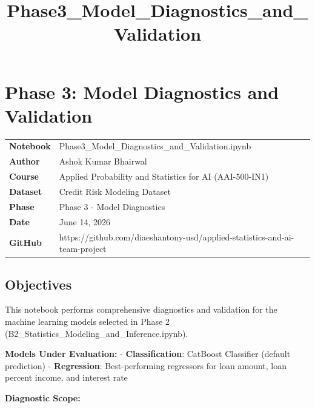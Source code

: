 \documentclass[11pt]{article}
\title{Phase3\_Model\_Diagnostics\_and\_Validation}
\begin{document}
    
    \maketitle
    
    

    
    \section{Phase 3: Model Diagnostics and
Validation}\label{phase-3-model-diagnostics-and-validation}

\begin{longtable}[]{@{}
  >{\raggedright\arraybackslash}p{}
  >{\raggedright\arraybackslash}p{}@{}}
\toprule\noalign{}
\endhead
\bottomrule\noalign{}
\endlastfoot
\textbf{Notebook} & Phase3\_Model\_Diagnostics\_and\_Validation.ipynb \\
\textbf{Author} & Ashok Kumar Bhairwal \\
\textbf{Course} & Applied Probability and Statistics for AI
(AAI-500-IN1) \\
\textbf{Dataset} & Credit Risk Modeling Dataset \\
\textbf{Phase} & Phase 3 - Model Diagnostics \\
\textbf{Date} & June 14, 2026 \\
\textbf{GitHub} &
https://github.com/diaeshantony-usd/applied-statistics-and-ai-team-project \\
\end{longtable}

\subsection{Objectives}\label{objectives}

This notebook performs comprehensive diagnostics and validation for the
machine learning models selected in Phase 2
(B2\_Statistics\_Modeling\_and\_Inference.ipynb).

\textbf{Models Under Evaluation:} - \textbf{Classification}: CatBoost
Classifier (default prediction) - \textbf{Regression}: Best-performing
regressors for loan amount, loan percent income, and interest rate

\textbf{Diagnostic Scope:}
\end{document}
